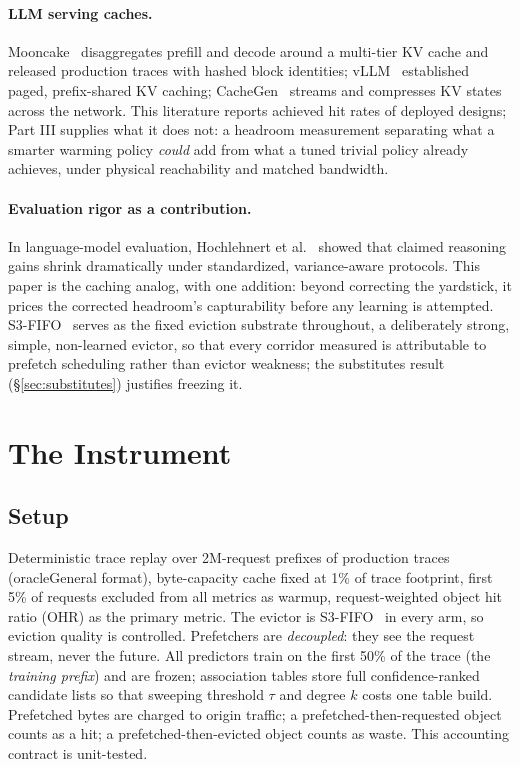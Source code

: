 \documentclass[11pt]{article}
\begin{document}
\paragraph{LLM serving caches.} Mooncake~\cite{mooncake} disaggregates prefill and decode around a multi-tier KV cache and released production traces with hashed block identities; vLLM~\cite{vllm} established paged, prefix-shared KV caching; CacheGen~\cite{cachegen} streams and compresses KV states across the network. This literature reports achieved hit rates of deployed designs; Part III supplies what it does not: a headroom measurement separating what a smarter warming policy \emph{could} add from what a tuned trivial policy already achieves, under physical reachability and matched bandwidth.

\paragraph{Evaluation rigor as a contribution.} In language-model evaluation, Hochlehnert et al.~\cite{sober} showed that claimed reasoning gains shrink dramatically under standardized, variance-aware protocols. This paper is the caching analog, with one addition: beyond correcting the yardstick, it prices the corrected headroom's capturability before any learning is attempted. S3-FIFO~\cite{s3fifo} serves as the fixed eviction substrate throughout, a deliberately strong, simple, non-learned evictor, so that every corridor measured is attributable to prefetch scheduling rather than evictor weakness; the substitutes result (\S\ref{sec:substitutes}) justifies freezing it.

\section{The Instrument}\label{sec:instrument}
\subsection{Setup}
Deterministic trace replay over 2M-request prefixes of production traces (oracleGeneral format), byte-capacity cache fixed at 1\% of trace footprint, first 5\% of requests excluded from all metrics as warmup, request-weighted object hit ratio (OHR) as the primary metric. The evictor is S3-FIFO~\cite{s3fifo} in every arm, so eviction quality is controlled. Prefetchers are \emph{decoupled}: they see the request stream, never the future. All predictors train on the first 50\% of the trace (the \emph{training prefix}) and are frozen; association tables store full confidence-ranked candidate lists so that sweeping threshold $\tau$ and degree $k$ costs one table build. Prefetched bytes are charged to origin traffic; a prefetched-then-requested object counts as a hit; a prefetched-then-evicted object counts as waste. This accounting contract is unit-tested.
\end{document}
